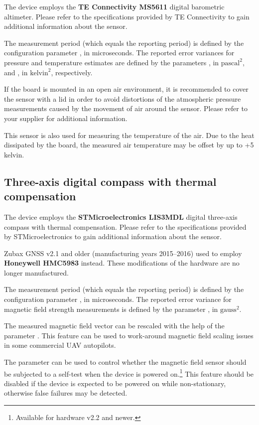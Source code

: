 \documentclass{zubaxdoc}
\begin{document}
The device employs the \textbf{TE Connectivity MS5611} digital barometric altimeter.
Please refer to the specifications provided by TE Connectivity to gain additional information about the sensor.

The measurement period (which equals the reporting period) is defined by the configuration parameter 
, in microseconds.
The reported error variances for pressure and temperature estimates are defined by the parameters
, in $\text{pascal}^2$, and , in $\text{kelvin}^2$,
respectively.

If the board is mounted in an open air environment, it is recommended to cover the sensor with a lid
in order to avoid distortions of the atmospheric pressure measurements caused by the movement of air
around the sensor.
Please refer to your supplier for additional information.

This sensor is also used for measuring the temperature of the air.
Due to the heat dissipated by the board,
the measured air temperature may be offset by up to +5 kelvin.

\subsection{Three-axis digital compass with thermal compensation}

The device employs the \textbf{STMicroelectronics LIS3MDL} digital three-axis compass with thermal compensation.
Please refer to the specifications provided by STMicroelectronics to gain additional information about the sensor.

Zubax GNSS v2.1 and older (manufacturing years 2015--2016) used to employ \textbf{Honeywell HMC5983} instead.
These modifications of the hardware are no longer manufactured.

The measurement period (which equals the reporting period) is defined by the configuration parameter 
, in microseconds.
The reported error variance for magnetic field strength measurements is defined by the parameter
, in $\text{gauss}^2$.

The measured magnetic field vector can be rescaled with the help of the parameter .
This feature can be used to work-around magnetic field scaling issues in some commercial UAV autopilots.

The parameter  can be used to control whether the magnetic field sensor should be
subjected to a self-test when the device is powered on.\footnote{Available for hardware v2.2 and newer.}
This feature should be disabled if the device is expected to be powered on while non-stationary,
otherwise false failures may be detected.
\end{document}
